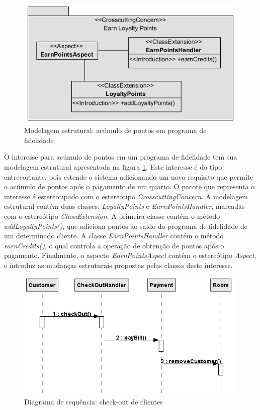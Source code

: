   \begin{figure}[!h]
	\centering
	\includegraphics{img/case_study_structural_earn_points.png}
	\caption{Modelagem estrutural: acúmulo de pontos em programa de fidelidade}\label{fig:case_study_structural_earn_points}
  \end{figure}

O interesse para acúmulo de pontos em um programa de fidelidade tem sua modelagem estrutural apresentada na figura
\ref{fig:case_study_structural_earn_points}. Este interesse é do tipo entrecortante, pois estende o sistema adicionando um novo requisito que
permite o acúmulo de pontos após o pagamento de um quarto. O pacote que representa o interesse é estereotipado com o estereótipo
\textit{CrosscuttingConcern}. A modelagem estrutural contém duas classes: \textit{LoyaltyPoints} e \textit{EarnPointsHandler}, marcadas com o
estereótipo \textit{ClassExtension}. A primeira classe contém o método \textit{addLoyaltyPoints()}, que adiciona pontos ao saldo do programa de
fidelidade de um determinado cliente. A classe \textit{EarnPointsHandler} contém o método \textit{earnCredits()}, o qual controla a operação de
obtenção de pontos após o pagamento. Finalmente, o aspecto \textit{EarnPointsAspect} contém o estereótipo \textit{Aspect}, e introduz as mudanças
estruturais propostas pelas classes deste interesse.

  \begin{figure}[!h]
	\centering
	\includegraphics{img/case_study_behavioral_check_out.png}
	\caption{Diagrama de sequência: check-out de clientes}\label{fig:case_study_behavioral_check_out}
  \end{figure}

